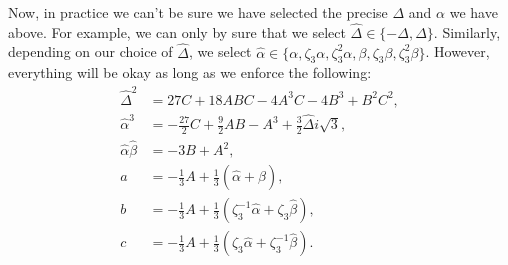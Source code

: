 Now, in practice we can't be sure we have selected the precise \(\Delta\) and \(\alpha\) we have above.
For example, we can only by sure that we select \(\hat\Delta \in \{-\Delta, \Delta\}\). Similarly, depending
on our choice of \(\hat \Delta\), we select \(\hat \alpha \in \{\alpha, \zeta_3\alpha, \zeta_3^2\alpha,
\beta, \zeta_3\beta, \zeta_3^2\beta\}\). However, everything will be okay as long as we enforce the
following:
\begin{align}
\hat\Delta^2 & = 27 C + 18 ABC
    - 4 A^3C - 4 B^3 + B^2 C^2, \\
\hat\alpha^3 & = -\frac{27}{2} C + \frac{9}{2} AB - A^3
    + \frac{3}{2} \hat\Delta i\sqrt{3}, \\
\hat\alpha \hat\beta & = -3B + A^2, \\
a & = -\frac{1}{3} A + \frac{1}{3}(\hat\alpha + \hat\beta), \\
b & = -\frac{1}{3} A + \frac{1}{3}(\zeta_3^{-1} \hat\alpha + \zeta_3 \hat\beta), \\
c & = -\frac{1}{3} A + \frac{1}{3}(\zeta_3 \hat\alpha + \zeta_3^{-1} \hat\beta). 
\end{align}
